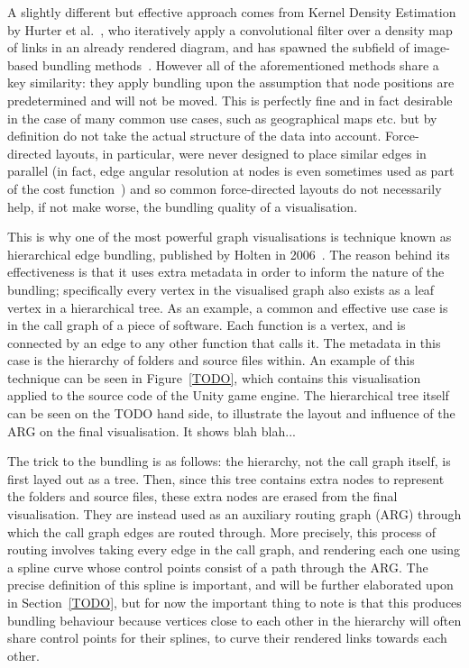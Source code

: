 A slightly different but effective approach comes from Kernel Density Estimation by Hurter et al.~\cite{TODO}, who iteratively apply a convolutional filter over a density map of links in an already rendered diagram, and has spawned the subfield of image-based bundling methods~\cite{TODO,TODO,TODO}.
However all of the aforementioned methods share a key similarity: they apply bundling upon the assumption that node positions are predetermined and will not be moved. This is perfectly fine and in fact desirable in the case of many common use cases, such as geographical maps etc. but by definition do not take the actual structure of the data into account. Force-directed layouts, in particular, were never designed to place similar edges in parallel (in fact, edge angular resolution at nodes is even sometimes used as part of the cost function~\cite{TODO}) and so common force-directed layouts do not necessarily help, if not make worse, the bundling quality of a visualisation.

This is why one of the most powerful graph visualisations is technique known as hierarchical edge bundling, published by Holten in 2006~\cite{TODO}. The reason behind its effectiveness is that it uses extra metadata in order to inform the nature of the bundling; specifically every vertex in the visualised graph also exists as a leaf vertex in a hierarchical tree. As an example, a common and effective use case is in the call graph of a piece of software. Each function is a vertex, and is connected by an edge to any other function that calls it. The metadata in this case is the hierarchy of folders and source files within.
An example of this technique can be seen in Figure~\ref{TODO}, which contains this visualisation applied to the source code of the Unity game engine. The hierarchical tree itself can be seen on the TODO hand side, to illustrate the layout and influence of the ARG on the final visualisation. It shows blah blah...

The trick to the bundling is as follows: the hierarchy, not the call graph itself, is first layed out as a tree. Then, since this tree contains extra nodes to represent the folders and source files, these extra nodes are erased from the final visualisation. They are instead used as an auxiliary routing graph (ARG) through which the call graph edges are routed through.
More precisely, this process of routing involves taking every edge in the call graph, and rendering each one using a spline curve whose control points consist of a path through the ARG. The precise definition of this spline is important, and will be further elaborated upon in Section~\ref{TODO}, but for now the important thing to note is that this produces bundling behaviour because vertices close to each other in the hierarchy will often share control points for their splines, to curve their rendered links towards each other.

